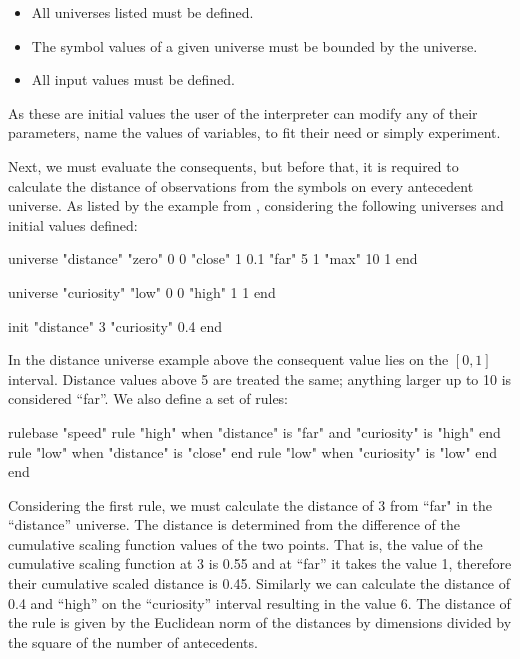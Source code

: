 \begin{itemize}
	\item All universes listed must be defined.
	\item The symbol values of a given universe must be bounded by the universe.
	\item All input values must be defined.
\end{itemize}

As these are initial values the user of the interpreter can modify any of their parameters, name the values of variables, to fit their need or simply experiment.

Next, we must evaluate the consequents, but before that, it is required to calculate the distance of observations from the symbols on every antecedent universe. As listed by the example from \cite{pillerkovacs2019}, considering the following universes and initial values defined:

\begin{fbdl}
universe "distance"
  "zero" 0 0
  "close" 1 0.1
  "far" 5 1
  "max" 10 1
end
\end{fbdl}

\begin{fbdl}
universe "curiosity"
  "low" 0 0
  "high" 1 1
end
\end{fbdl}

\begin{fbdl}
init
  "distance" 3
  "curiosity" 0.4
end
\end{fbdl}

\noindent In the distance universe example above the consequent value lies on the $[0, 1]$ interval. Distance values above 5 are treated the same; anything larger up to 10 is considered ``far''.
We also define a set of rules:

\begin{fbdl}
rulebase "speed" 
  rule "high" when "distance" is "far" and "curiosity" is "high" end 
  rule "low" when "distance" is "close" end 
  rule "low" when "curiosity" is "low" end 
end
\end{fbdl}

Considering the first rule, we must calculate the distance of 3 from ``far" in the ``distance” universe. The distance is determined from the difference of the cumulative scaling function values of the two points. That is, the value of the cumulative scaling function at 3 is 0.55 and at ``far” it takes the value 1, therefore their cumulative scaled distance is 0.45. Similarly we can calculate the distance of 0.4 and “high” on the “curiosity” interval resulting in the value 6. The distance of the rule is given by the Euclidean norm of the distances by dimensions divided by the square of the number of antecedents.

